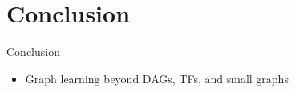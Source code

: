 \section{Conclusion}
\begin{frame}{Conclusion}
\begin{itemize}
    \item Graph learning beyond DAGs, TFs, and small graphs


\end{itemize}
\end{frame}
